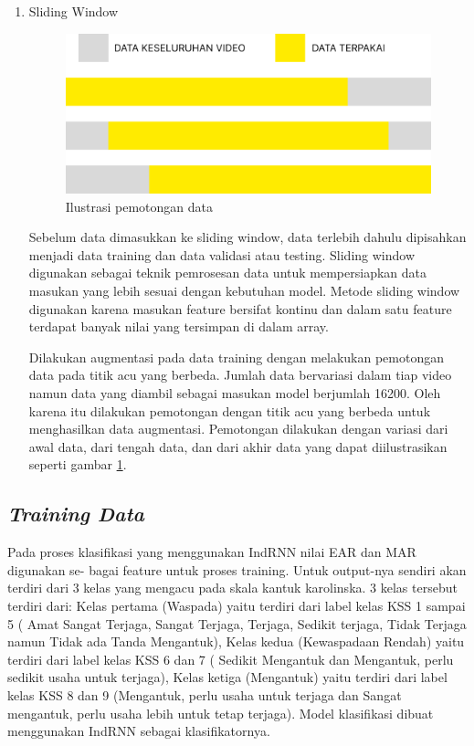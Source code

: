 \begin{enumerate}[nolistsep]
      \item Sliding Window

            \begin{figure} [ht] \centering
                  \includegraphics[scale=0.15]{gambar/PotongData.png}
                  \caption{Ilustrasi pemotongan data}
                  \label{fig:potong}
            \end{figure}
            Sebelum data dimasukkan ke sliding window, data terlebih dahulu dipisahkan menjadi data training dan data validasi atau
            testing. Sliding window digunakan sebagai teknik pemrosesan data untuk mempersiapkan data masukan yang lebih
            sesuai dengan kebutuhan model.  Metode sliding window digunakan karena masukan feature bersifat kontinu dan dalam satu
            feature terdapat banyak nilai yang tersimpan di dalam array.

            Dilakukan augmentasi pada data training dengan melakukan pemotongan data pada titik acu yang berbeda. Jumlah data bervariasi
            dalam tiap video namun data yang diambil sebagai masukan model berjumlah 16200. Oleh karena itu dilakukan pemotongan dengan
            titik acu yang berbeda untuk menghasilkan data augmentasi. Pemotongan dilakukan dengan variasi dari awal data, dari tengah data, dan dari akhir data  yang dapat diilustrasikan
            seperti gambar \ref{fig:potong}.
\end{enumerate}

\subsection{\emph{Training Data}}
Pada proses klasifikasi yang menggunakan IndRNN nilai EAR dan MAR digunakan se-
bagai feature untuk proses training. Untuk output-nya sendiri akan terdiri dari 3 kelas yang
mengacu pada skala kantuk karolinska. 3 kelas tersebut terdiri dari: Kelas pertama (Waspada)
yaitu terdiri dari label kelas KSS 1 sampai 5 ( Amat Sangat Terjaga, Sangat Terjaga, Terjaga,
Sedikit terjaga, Tidak Terjaga namun Tidak ada Tanda Mengantuk), Kelas kedua (Kewaspadaan
Rendah) yaitu terdiri dari label kelas KSS 6 dan 7 ( Sedikit Mengantuk dan Mengantuk, perlu
sedikit usaha untuk terjaga), Kelas ketiga (Mengantuk) yaitu terdiri dari label kelas KSS 8 dan
9 (Mengantuk, perlu usaha untuk terjaga dan Sangat mengantuk, perlu usaha lebih untuk tetap
terjaga). Model klasifikasi dibuat menggunakan IndRNN sebagai klasifikatornya.


